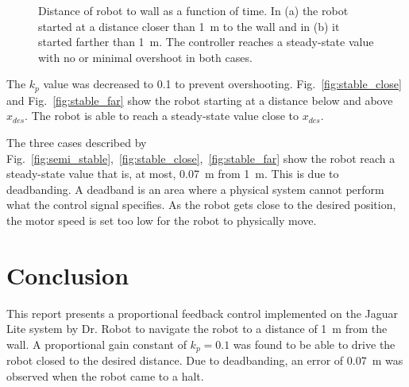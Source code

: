 \documentclass[conference]{IEEEtran}
\begin{document}
\begin{figure}[t]
  \centering
  \caption{Distance of robot to wall as a function of time.  In (a) the robot started at a
    distance closer than \SI{1}{\meter} to the wall and in (b) it started farther than
    \SI{1}{\meter}. The controller reaches a steady-state value with no or minimal
  overshoot in both cases.}
  \label{fig:stable_controller}
\end{figure}

The $k_p$ value was decreased to 0.1 to prevent overshooting. Fig.~\ref{fig:stable_close}
and Fig.~\ref{fig:stable_far} show the robot starting at a distance below and above
$x_{des}$. The robot is able to reach a steady-state value close to $x_{des}$.

The three cases described by
Fig.~\ref{fig:semi_stable},~\ref{fig:stable_close},~\ref{fig:stable_far} show the robot
reach a steady-state value that is, at most, \SI{0.07}{\meter} from \SI{1}{\meter}. This is due to
deadbanding. A deadband is an area where a physical system cannot perform what the control
signal specifies. As the robot gets close to the desired position, the motor speed is set
too low for the robot to physically move.

\section{Conclusion}
This report presents a proportional feedback control implemented on the Jaguar Lite system
by Dr. Robot to navigate the robot to a distance of \SI{1}{\meter} from the wall. A
proportional gain constant of $k_{p} = 0.1$ was found to be able to drive the robot closed
to the desired distance. Due to deadbanding, an error of \SI{0.07}{\meter} was
observed when the robot came to a halt.
\end{document}
